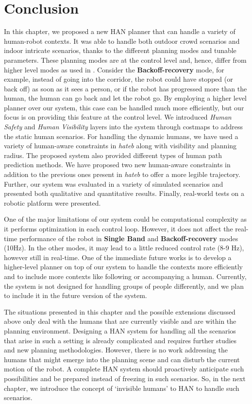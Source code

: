 \section{Conclusion}\label{conclude_chap4}
In this chapter, we proposed a new HAN planner that can handle a variety of human-robot contexts. It was able to handle both outdoor crowd scenarios and indoor intricate scenarios, thanks to the different planning modes and tunable parameters. These planning modes are at the control level and, hence, differ from higher level modes as used in \cite{mehta2016autonomous}. Consider the \textbf{Backoff-recovery} mode, for example, instead of going into the corridor, the robot could have stopped (or back off) as soon as it sees a person, or if the robot has progressed more than the human, the human can go back and let the robot go. By employing a higher level planner over our system, this case can be handled much more efficiently, but our focus is on providing this feature at the control level. We introduced \textit{Human Safety} and \textit{Human Visibility} layers into the system through costmaps to address the static human scenarios. For handling the dynamic humans, we have used a variety of human-aware constraints in \textit{\acrshort{hateb}} along with visibility and planning radius. The proposed system also provided different types of human path prediction methods. We have proposed two new human-aware constraints in addition to the previous ones present in \textit{\acrshort{hateb}} to offer a more legible trajectory. Further, our system was evaluated in a variety of simulated scenarios and presented both qualitative and quantitative results. Finally, real-world tests on a robotic platform were presented.

One of the major limitations of our system could be computational complexity as it performs optimization in each control loop. However, it does not affect the real-time performance of the robot in \textbf{Single Band} and \textbf{Backoff-recovery} modes (10Hz). In the other modes, it may lead to a little reduced control rate (8-9 Hz), however still in real-time. One of the immediate future works is to develop a higher-level planner on top of our system to handle the contexts more efficiently and to include more contexts like following or accompanying a human. Currently, the system is not designed for handling groups of people differently, and we plan to include it in the future version of the system. 
 
The situations presented in this chapter and the possible extensions discussed above only deal with the humans that are currently visible and are within the planning environment. Designing a HAN system for handling all the scenarios that arise in such a setting is already complicated and requires further studies and new planning methodologies. However, there is no work addressing the humans that might emerge into the planning scene and can disturb the current motion of the robot. A complete HAN system should proactively anticipate such possibilities and be prepared instead of freezing in such scenarios. So, in the next chapter, we introduce the concept of `invisible humans' to HAN to handle such scenarios.

